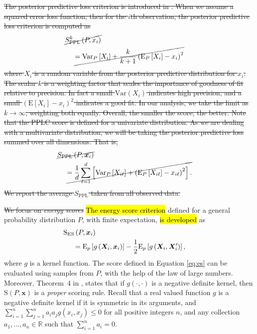 \documentclass[iicol,sn-basic]{sn-jnl}
\theoremstyle{thmstyleone}
\begin{document}
\st{The posterior predictive loss criterion is introduced in \mbox{\cite{gelfand1998}}.  When we assume a squared error loss function, then for the $i$th observation, the posterior predictive loss criterion is computed as}\begin{equation}
\label{eq:ppl}
\begin{aligned}
&\hspace{-0.5cm}\cancel{S_{\text{PPL}}^k\left(P,x_i\right)} \\
&\cancel{=\text{Var}_P\left[X_i\right] + \frac{k}{k+1}\left(\text{E}_P\left[X_{i}\right] - x_i\right)^2}
\end{aligned}
\end{equation}
\st{where $X_i$ is a random variable from the posterior predictive distribution for $x_i$.  The scalar $k$ is a weighting factor that scales the importance of goodness of fit relative to precision.  In fact a small $\text{Var}(X_{i})$ indicates high precision, and a small $(\text{E}[X_{i}] - x_{i})^2$  indicates a good fit.  In our analysis, we take the limit as $k\to\infty$, weighting both equally. Overall, the smaller the score, the better.  Note that the PPLC score is defined for a univariate distribution.  As we are dealing with a multivariate distribution, we will be taking the posterior predictive loss summed over all dimensions.  That is,}
\begin{equation}
\label{eq:ppl2}
\begin{aligned}
&\hspace{-0.5cm}\cancel{S_{\text{PPL}}\left(P,\bm{x}_i\right)} \\
&\cancel{=\frac{1}{d}\sum_{\ell = 1}^d\left[\text{Var}_P\left[X_{i\ell}\right] + \left(\text{E}_P\left[X_{i\ell}\right] - x_{i\ell}\right)^2\right].}
\end{aligned}
\end{equation}
\st{We report the average $S_{\text{PPL}}$ taken from all observed data.}


\st{We focus on \emph{energy scores}} \hl{The energy score criterion} defined for a general probability distribution $P$, with finite expectation, \hl{is developed} as
\begin{equation}
\label{eq:es}
\begin{aligned}
&\hspace{-0.5cm}\text{S}_{\text{ES}}\left(P, \bm{x}_i\right) \\
&=\text{E}_p \left[g\left(\bm{X}_i, \bm{x}_i\right)\right] -
\frac{1}{2}\text{E}_p \left[g\left(\bm{X}_i,\bm{X}_i^{\prime}\right)\right],
\end{aligned}
\end{equation}
where $g$ is a kernel function. The score defined in Equation \eqref{eq:es} can be evaluated using samples from $P$, with the help of the law of large numbers.   Moreover, Theorem~4 in \cite{gneiting2007}, states that if $g(\cdot,\cdot)$ is a negative   definite kernel, then $\text{S}(P,\bm{x})$ is a \emph{proper} scoring rule.  Recall that a real valued function $g$ is a negative definite kernel if it is symmetric in its arguments, and $\sum_{i=1}^n\sum_{j=1}^na_ia_jg(x_i,x_j)\leq 0$ for all positive integers $n$, and any collection $a_1,\ldots,a_n\in{\mathbb R}$ such that  $\sum_{i = 1}^na_i = 0$.
\end{document}

